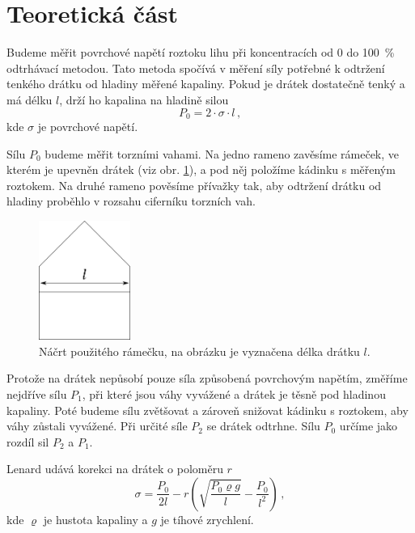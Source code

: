 \section*{Teoretická část}
Budeme měřit povrchové napětí roztoku lihu při koncentracích od 0 do \SI{100}{\percent} odtrhávací metodou.
Tato metoda spočívá v měření síly potřebné k odtržení tenkého drátku od hladiny měřené kapaliny.
Pokud je drátek dostatečně tenký a má délku $l$, drží ho kapalina na hladině silou \cite{ZFP}
\begin{equation} \label{eq::p0sigma}
P_0=2 \cdot \sigma \cdot l \,,
\end{equation}
kde $\sigma$ je povrchové napětí.

Sílu $P_0$ budeme měřit torzními vahami.
Na jedno rameno zavěsíme rámeček, ve kterém je upevněn drátek (viz obr. \ref{obr::ramecek}), a pod něj položíme kádinku s měřeným roztokem.
Na druhé rameno pověsíme přívažky tak, aby odtržení drátku od hladiny proběhlo v rozsahu ciferníku torzních vah.

\begin{figure}[htbp]
\centering
\includegraphics[width=3cm]{graficos/ramecek}
\caption{Náčrt použitého rámečku, na obrázku je vyznačena délka drátku $l$.}
\label{obr::ramecek}
\end{figure}

Protože na drátek nepůsobí pouze síla způsobená povrchovým napětím, změříme nejdříve sílu $P_1$, při které jsou váhy vyvážené a drátek je těsně pod hladinou kapaliny.
Poté budeme sílu zvětšovat a zároveň snižovat kádinku s roztokem, aby váhy zůstali vyvážené.
Při určité síle $P_2$ se drátek odtrhne.
Sílu $P_0$ určíme jako rozdíl sil $P_2$ a $P_1$.

Lenard \cite{oprava} udává korekci na drátek o poloměru $r$
\begin{equation} \label{eq::lenard}
\sigma = \frac{P_0}{2l} - r\left( \sqrt{\frac{P_0 \varrho g}{l}} - \frac{P_0}{l^2} \right) \,,
\end{equation}
kde $\varrho$ je hustota kapaliny a $g$ je tíhové zrychlení.
